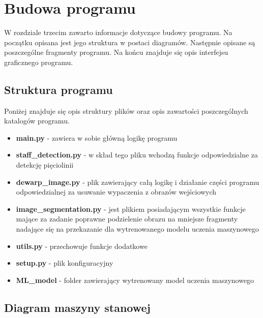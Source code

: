 \chapter{Budowa programu}
W rozdziale trzecim zawarto informacje dotyczące budowy programu. Na początku opisana jest jego struktura w postaci diagramów. Następnie opisane są poszczególne fragmenty programu. Na końcu znajduje się opis interfejsu graficznego programu.


\section{Struktura programu}

Poniżej znajduje się opis struktury plików oraz opis zawartości poszczególnych katalogów programu.

\begin{itemize}
	\item \textbf{main.py} - zawiera w sobie główną logikę programu
	\item \textbf{staff\_detection.py} - w skład tego pliku wchodzą funkcje odpowiedzialne za detekcję pięciolinii
	\item \textbf{dewarp\_image.py} - plik zawierający całą logikę i działanie części programu odpowiedzialnej za usuwanie wypaczenia z obrazów wejściowych
	\item \textbf{image\_segmentation.py} - jest plikiem posiadającym wszystkie funkcje mające za zadanie poprawne podzielenie obrazu na mniejsze fragmenty nadające się na przekazanie dla wytrenowanego modelu uczenia maszynowego
	\item \textbf{utils.py} - przechowuje funkcje dodatkowe
	\item \textbf{setup.py} - plik konfiguracyjny 
	\item \textbf{ML\_model} - folder zawierający wytrenowany model uczenia maszynowego
\end{itemize}

\section{Diagram maszyny stanowej}

